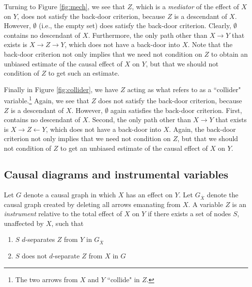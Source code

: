 \documentclass[11pt,reqno,titlepage]{amsart}
\begin{document}
Turning to Figure \ref{fig:mech}, we see that $Z$, which is a \emph{mediator} of the effect of $X$ on $Y$, does not satisfy the back-door criterion, because $Z$ is a descendant of $X$.
However, $\emptyset$ (i.e., the empty set) does satisfy the back-door criterion.
Clearly, $\emptyset$ contains no descendant of $X$.
Furthermore, the only path other than $X \rightarrow Y$ that exists is $X \rightarrow Z \rightarrow Y$, which does not have a back-door into $X$.
Note that the back-door criterion not only implies that we need not condition on $Z$ to obtain an unbiased estimate of the causal effect of $X$ on $Y$, but that we should not condition of $Z$ to get such an estimate.

Finally in Figure \ref{fig:collider}, we have $Z$ acting as what \citet[p.\,17]{Pearl:2009kh} refers to as a ``collider" variable.\footnote{
The two arrows from $X$ and $Y$ ``collide" in $Z$.} 
Again, we see that $Z$ does not satisfy the back-door criterion, because $Z$ is a descendant of $X$.
However, $\emptyset$ again satisfies the back-door criterion.
First, contains no descendant of $X$.
Second, the only path other than $X \rightarrow Y$ that exists is $X \rightarrow Z \leftarrow Y$, which does not have a back-door into $X$.
Again, the back-door criterion not only implies that we need not condition on $Z$, but that we should not condition of $Z$ to get an unbiased estimate of the causal effect of $X$ on $Y$.

 \subsection{Causal diagrams and instrumental variables}

\begin{definition}[Instrument]
Let $G$ denote a causal graph in which $X$ has an effect on $Y$. 
Let $G_{\overline{X}}$ denote the causal graph created by deleting all arrows emanating from $X$.
A variable $Z$ is an \emph{instrument} relative to the total effect of $X$ on $Y$ if there exists a set of nodes $S$, unaffected by $X$, such that
\begin{enumerate}
\item $S$ $d$-separates $Z$ from $Y$ in $G_{\overline{X}}$
\item $S$ does not $d$-separate $Z$ from $X$ in $G$
\end{enumerate}
\end{definition}
\end{document}
